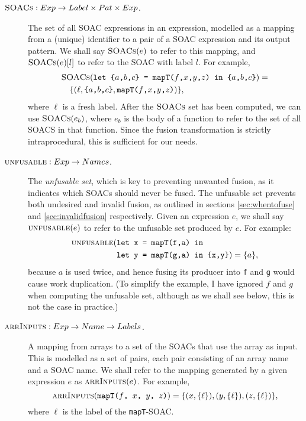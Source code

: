\begin{description}
\item[$\textsc{SOACs} : Exp \rightarrow Label \times Pat \times Exp$.] The set
  of all SOAC expressions in an expression, modelled as a mapping from
  a (unique) identifier to a pair of a SOAC expression and its output
  pattern.  We shall say $\textsc{SOACs}(e)$ to refer to this mapping, and
  $\textsc{SOACs}(e)[l]$ to refer to the SOAC with label $l$.  For example,
  \begin{align*}
  & \textsc{SOACs}(\texttt{let \{$a$,$b$,$c$\} = mapT($f$,$x$,$y$,$z$) in \{$a$,$b$,$c$\}}) =\\
  & \quad \{ (\ell, \texttt{\{$a$,$b$,$c$\}},\texttt{mapT($f$,$x$,$y$,$z$)}) \},
  \end{align*}
  where $\ell$ is a fresh label.  After the $\textsc{SOACs}$ set has been
  computed, we can use $\textsc{SOACs}(e_{b})$, where $e_{b}$ is the body of a
  function to refer to the set of all SOACS in that function.  Since
  the fusion transformation is strictly intraprocedural, this is
  sufficient for our needs.

\item[$\textsc{unfusable} : Exp \rightarrow Names$.] The \textit{unfusable set}, which
  is key to preventing unwanted fusion, as it indicates which SOACs
  should never be fused.  The unfusable set prevents both undesired
  and invalid fusion, as outlined in sections \ref{sec:whentofuse} and
  \ref{sec:invalidfusion} respectively.  Given an \LO{} expression
  $e$, we shall say $\textsc{unfusable}(e)$ to refer to the unfusable set
  produced by $e$.  For example:
  \begin{align*}
  \textsc{unfusable}(&\texttt{let x = mapT(f,a) in}\\
  &\texttt{let y = mapT(g,a) in \{x,y\}}) = \{a\},
  \end{align*}
  because $a$ is used twice, and hence fusing its producer into
  \texttt{f} and \texttt{g} would cause work duplication.  (To
  simplify the example, I have ignored $f$ and $g$ when computing the
  unfusable set, although as we shall see below, this is not the case
  in practice.)

\item[$\textsc{arrInputs} : Exp \rightarrow Name \rightarrow Labels$.] A mapping from arrays to a set of the SOACs that use the array
  as input.  This is modelled as a set of pairs, each pair consisting
  of an array name and a SOAC name.  We shall refer to the mapping
  generated by a given expression $e$ as $\textsc{arrInputs}(e)$.  For example,
  \[
  \textsc{arrInputs}(\texttt{mapT($f$, $x$, $y$, $z$)}) = \{ (x, \{\ell\}), (y, \{\ell\}), (z, \{\ell\}) \},
  \]
  where $\ell$ is the label of the \texttt{mapT}-SOAC.


\end{description}
